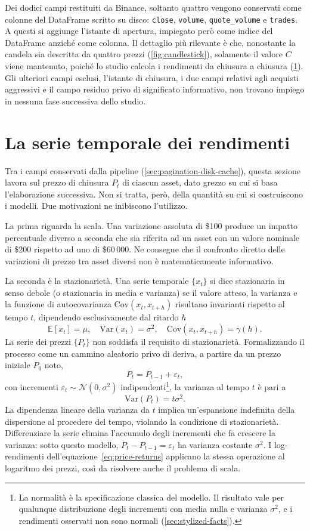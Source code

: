 Dei dodici campi restituiti da Binance, soltanto quattro vengono conservati come colonne del DataFrame scritto su disco: \texttt{close}, \texttt{volume}, \texttt{quote\_volume} e \texttt{trades}. A questi si aggiunge l'istante di apertura, impiegato però come indice del DataFrame anziché come colonna. Il dettaglio più rilevante è che, nonostante la candela sia descritta da quattro prezzi (\cref{fig:candlestick}), solamente il valore $C$ viene mantenuto, poiché lo studio calcola i rendimenti da chiusura a chiusura (\cref{sec:returns-stationarity}). Gli ulteriori campi esclusi, l'istante di chiusura, i due campi relativi agli acquisti aggressivi e il campo residuo privo di significato informativo, non trovano impiego in nessuna fase successiva dello studio.

\section{La serie temporale dei rendimenti}
\label{sec:returns-stationarity}

Tra i campi conservati dalla pipeline (\cref{sec:pagination-disk-cache}), questa sezione lavora sul prezzo di chiusura $P_t$ di ciascun asset, dato grezzo su cui si basa l'elaborazione successiva. Non si tratta, però, della quantità su cui si costruiscono i modelli. Due motivazioni ne inibiscono l'utilizzo.

La prima riguarda la scala. Una variazione assoluta di \$100 produce un impatto percentuale diverso a seconda che sia riferita ad un asset con un valore nominale di \$200 rispetto ad uno di \$60\,000. Ne consegue che il confronto diretto delle variazioni di prezzo tra asset diversi non è matematicamente informativo.

La seconda è la stazionarietà. Una serie temporale $\{x_t\}$ si dice stazionaria in senso debole (o stazionaria in media e varianza) se il valore atteso, la varianza e la funzione di autocovarianza $\mathrm{Cov}(x_t, x_{t+h})$ risultano invarianti rispetto al tempo $t$, dipendendo esclusivamente dal ritardo $h$
$$\mathbb{E}[x_t] = \mu, \quad \mathrm{Var}(x_t) = \sigma^2, \quad \mathrm{Cov}(x_t, x_{t+h}) = \gamma(h).$$
La serie dei prezzi $\{P_t\}$ non soddisfa il requisito di stazionarietà. Formalizzando il processo come un cammino aleatorio privo di deriva, a partire da un prezzo iniziale $P_0$ noto,
$$P_t = P_{t-1} + \varepsilon_t,$$
con incrementi $\varepsilon_t \sim \mathcal{N}(0,\sigma^2)$ indipendenti\footnote{La normalità è la specificazione classica del modello. Il risultato vale per qualunque distribuzione degli incrementi con media nulla e varianza $\sigma^2$, e i rendimenti osservati non sono normali (\cref{sec:stylized-facts}).}, la varianza al tempo $t$ è pari a
$$\mathrm{Var}(P_t) = t\sigma^2.$$
La dipendenza lineare della varianza da $t$ implica un'espansione indefinita della dispersione al procedere del tempo, violando la condizione di stazionarietà. Differenziare la serie elimina l'accumulo degli incrementi che fa crescere la varianza: sotto questo modello, $P_t - P_{t-1} = \varepsilon_t$ ha varianza costante $\sigma^2$. I log-rendimenti dell'equazione~\eqref{eq:price-returns} applicano la stessa operazione al logaritmo dei prezzi, così da risolvere anche il problema di scala.

